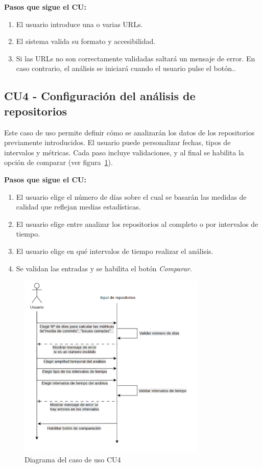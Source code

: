 \textbf{Pasos que sigue el CU:}
\begin{enumerate}
  \item El usuario introduce una o varias URLs.
  \item El sistema valida su formato y accesibilidad.
  \item Si las URLs no son correctamente validadas saltará un mensaje de error. En caso contrario, el análisis se iniciará cuando el usuario pulse el botón..
\end{enumerate}

\subsection*{CU4 - Configuración del análisis de repositorios}

Este caso de uso permite definir cómo se analizarán los datos de los repositorios previamente introducidos. El usuario puede personalizar fechas, tipos de intervalos y métricas. Cada paso incluye validaciones, y al final se habilita la opción de comparar (ver figura~\ref{fig:DiagramaCU4}).

\textbf{Pasos que sigue el CU:}
\begin{enumerate}
  \item El usuario elige el número de días sobre el cual se basarán las medidas de calidad que reflejan medias estadísticas.
  \item El usuario elige entre analizar los repositorios al completo o por intervalos de tiempo.
  \item El usuario elige en qué intervalos de tiempo realizar el análisis.
  \item Se validan las entradas y se habilita el botón \textit{Comparar}.
\end{enumerate}

\begin{figure}[H]
\centering
\includegraphics[width=0.8\textwidth]{img/DiagramaCU4.png}
\caption{Diagrama del caso de uso CU4}
\label{fig:DiagramaCU4}
\end{figure}

